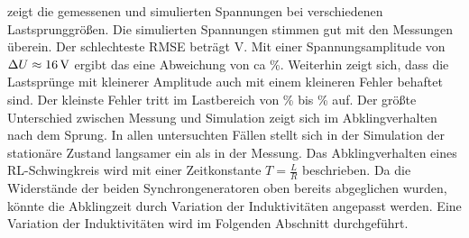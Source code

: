  zeigt die gemessenen und simulierten Spannungen bei verschiedenen Lastsprunggrößen. Die simulierten Spannungen stimmen gut mit den Messungen überein. Der schlechteste RMSE beträgt \unit[1,33]{V}. Mit einer Spannungsamplitude von $\Delta U\approx\unit[16]{V}$ ergibt das eine Abweichung von ca \unit[8,3]{\%}. Weiterhin zeigt sich, dass  die Lastsprünge mit kleinerer Amplitude auch mit einem kleineren Fehler behaftet sind. Der kleinste Fehler tritt im Lastbereich von \unit[50]{\%} bis \unit[100]{\%} auf. Der größte Unterschied zwischen Messung und Simulation zeigt sich im Abklingverhalten nach dem Sprung. In allen untersuchten Fällen stellt sich in der Simulation der stationäre Zustand langsamer ein als in der Messung. Das Abklingverhalten eines RL-Schwingkreis wird mit einer Zeitkonstante $T=\frac{L}{R}$ beschrieben. Da die Widerstände der beiden Synchrongeneratoren oben bereits abgeglichen wurden, könnte die Abklingzeit durch Variation der Induktivitäten angepasst werden. Eine Variation der Induktivitäten wird im Folgenden Abschnitt durchgeführt.
